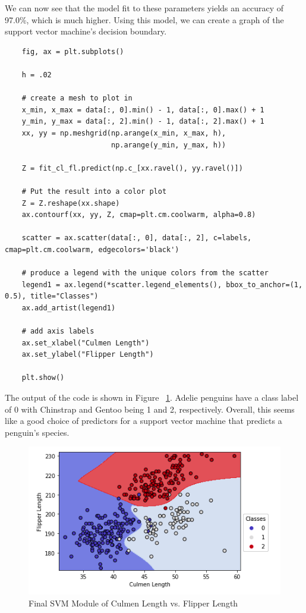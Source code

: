 \documentclass[12pt]{article}
\begin{document}
We can now see that the model fit to these parameters yields an accuracy of 97.0\%, which is much higher. Using this model, we can create a graph of the support vector machine's decision boundary.

\begin{verbatim}
    fig, ax = plt.subplots()

    h = .02
    
    # create a mesh to plot in
    x_min, x_max = data[:, 0].min() - 1, data[:, 0].max() + 1
    y_min, y_max = data[:, 2].min() - 1, data[:, 2].max() + 1
    xx, yy = np.meshgrid(np.arange(x_min, x_max, h),
                         np.arange(y_min, y_max, h))
    
    Z = fit_cl_fl.predict(np.c_[xx.ravel(), yy.ravel()])
    
    # Put the result into a color plot
    Z = Z.reshape(xx.shape)
    ax.contourf(xx, yy, Z, cmap=plt.cm.coolwarm, alpha=0.8)
    
    scatter = ax.scatter(data[:, 0], data[:, 2], c=labels, cmap=plt.cm.coolwarm, edgecolors='black')
    
    # produce a legend with the unique colors from the scatter
    legend1 = ax.legend(*scatter.legend_elements(), bbox_to_anchor=(1, 0.5), title="Classes")
    ax.add_artist(legend1)
    
    # add axis labels
    ax.set_xlabel("Culmen Length")
    ax.set_ylabel("Flipper Length")
    
    plt.show()      
\end{verbatim}

The output of the code is shown in Figure ~\ref{fig_fit_cl_fl}. Adelie penguins have a class label of 0 with Chinstrap and Gentoo being 1 and 2, respectively. Overall, this seems like a good choice of predictors for a support vector machine that predicts a penguin's species.

\begin{figure}[H]
    \centering
    \includegraphics[width=5in]{Figures/penguins/fit_cl_fl.png}
    \caption{Final SVM Module of Culmen Length vs. Flipper Length}
    \label{fig_fit_cl_fl}
\end{figure}
\end{document}
